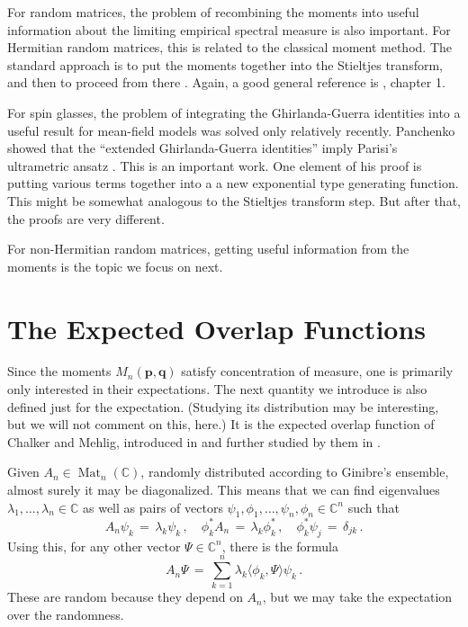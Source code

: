 \documentclass[12pt]{report}
\newcommand{\C}{\mathbb{C}}
\newcommand{\be}{\begin{equation}}
\newcommand{\ee}{\end{equation}}
\newcommand{\Mat}{\operatorname{Mat}}
\theoremstyle{definition}
\begin{document}
For random matrices, the problem of recombining the moments into useful information
about the limiting empirical spectral measure is also important.
For Hermitian random matrices, this is related to the classical moment method.
The standard approach is to put the moments together into the Stieltjes transform,
and then to proceed from there \cite{Pastur}.
Again, a good general reference is \cite{AndersonGuionnetZeitouni}, chapter 1.

For spin glasses, the problem of integrating the Ghirlanda-Guerra identities
into a useful result for mean-field models was solved only relatively recently.
Panchenko showed that the ``extended Ghirlanda-Guerra identities'' imply
Parisi's ultrametric ansatz \cite{Panchenko}.
This is an important work. One element of his proof is putting various terms together into a
a new exponential type generating function. 
This might be somewhat analogous to the Stieltjes transform step.
But after that, the proofs are very different.

For non-Hermitian random matrices, getting useful information from the moments
is the topic we focus on next.

\section{The Expected Overlap Functions}
\label{sec:Expected}

Since the moments $M_n(\mathbf{p},\mathbf{q})$ satisfy concentration of measure, one is primarily only interested in their expectations.
The next quantity we introduce is also defined just for the expectation.
(Studying its distribution may be interesting, but we will not comment on this, here.)
It is the expected overlap function of Chalker and Mehlig, introduced in \cite{CM} and further studied by them in \cite{MC}.

Given $A_n \in \Mat_n(\C)$, randomly distributed according to Ginibre's ensemble, almost surely it may be diagonalized.
This means that we can find eigenvalues $\lambda_1,\dots,\lambda_n \in \C$ as well as pairs of vectors $\psi_1,\phi_1,\dots,\psi_n,\phi_n \in \C^n$ such that
\be
A_n \psi_k\,=\, \lambda_k \psi_k\, ,\quad
\phi_k^* A_n\, =\, \lambda_k \phi_k^*\, ,\quad
\phi_k^* \psi_j\, =\, \delta_{jk}\, .
\ee
Using this, for any other vector $\Psi \in \C^n$, there is the formula
\be
A_n \Psi\, =\, \sum_{k=1}^{n} \lambda_k \langle \phi_k, \Psi \rangle \psi_k\, .
\ee
These are random because they depend on $A_n$, but we may take the expectation over the randomness.
\end{document}
